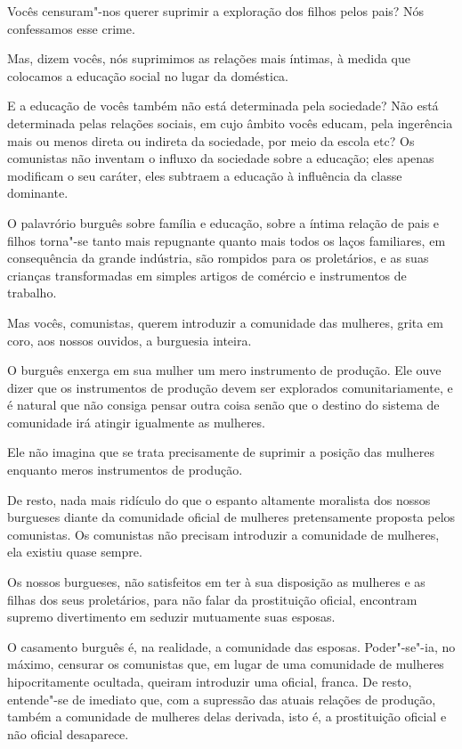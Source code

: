 Vocês censuram"-nos querer suprimir a exploração dos filhos pelos pais?
Nós confessamos esse crime.

Mas, dizem vocês, nós suprimimos as relações mais íntimas, à medida que
colocamos a educação social no lugar da doméstica.

E a educação de vocês também não está determinada pela sociedade? Não
está determinada pelas relações sociais, em cujo âmbito vocês educam,
pela ingerência mais ou menos direta ou indireta da sociedade, por meio
da escola etc? Os comunistas não inventam o influxo da sociedade sobre
a educação; eles apenas modificam o seu caráter, eles subtraem a
educação à influência da classe dominante.

O palavrório burguês sobre família e educação, sobre a íntima relação de
pais e filhos torna"-se tanto mais repugnante quanto mais todos os
laços familiares, em consequência da grande indústria, são rompidos
para os proletários, e as suas crianças transformadas em simples
artigos de comércio e instrumentos de trabalho.

Mas vocês, comunistas, querem introduzir a comunidade das mulheres,
grita em coro, aos nossos ouvidos, a burguesia inteira.

O burguês enxerga em sua mulher um mero instrumento de produção. Ele
ouve dizer que os instrumentos de produção devem ser explorados
comunitariamente, e é natural que não consiga pensar outra coisa senão
que o destino do sistema de comunidade irá atingir igualmente as
mulheres.

Ele não imagina que se trata precisamente de suprimir a posição das
mulheres enquanto meros instrumentos de produção.

De resto, nada mais ridículo do que o espanto altamente moralista dos
nossos burgueses diante da comunidade oficial de mulheres pretensamente
proposta pelos comunistas. Os comunistas não precisam introduzir a
comunidade de mulheres, ela existiu quase sempre.

Os nossos burgueses, não satisfeitos em ter à sua disposição as mulheres
e as filhas dos seus proletários, para não falar da prostituição
oficial, encontram supremo divertimento em seduzir mutuamente suas
esposas.

O casamento burguês é, na realidade, a comunidade das esposas.
Poder"-se"-ia, no máximo, censurar os comunistas que, em lugar de
uma comunidade de mulheres hipocritamente ocultada, queiram
introduzir uma oficial, franca. De resto, entende"-se de imediato que,
com a supressão das atuais relações de produção, também a comunidade de
mulheres delas derivada, isto é, a prostituição oficial e não oficial
desaparece.

